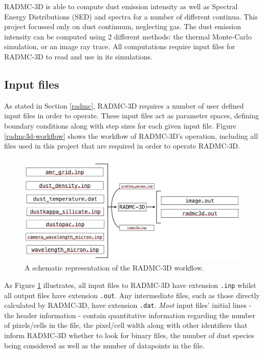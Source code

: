 \documentclass{report}
\begin{document}
RADMC-3D is able to compute dust emission intensity as well as Spectral Energy Distributions (SED) and spectra for a number of different continua. This project focussed only on dust continuum, neglecting gas. The dust emission intensity can be computed using 2 different methods: the thermal Monte-Carlo simulation, or an image ray trace. All computations require input files for RADMC-3D to read and use in its simulations.

\subsection{Input files} \label{inp}
As stated in Section \ref{radmc}, RADMC-3D requires a number of user defined input files in order to operate. These input files act as parameter spaces, defining boundary conditions along with step sizes for each given input file. Figure \ref{radmc3d-workflow} shows the workflow of RADMC-3D's operation, including all files used in this project that are required in order to operate RADMC-3D.

\begin{figure}[h]
  \centering
  \includegraphics[scale=0.4]{../img/radmc3d-workflow}
  \caption[A schematic representation of the RADMC-3D workflow.]{A schematic representation of the RADMC-3D workflow.}
  \label{fig:radmc3d-workflow}
\end{figure}

As Figure \ref{fig:radmc3d-workflow} illustrates, all input files to RADMC-3D have extension \texttt{.inp} whilst all output files have extension \texttt{.out}. Any intermediate files, such as those directly calculated by RADMC-3D, have extension \texttt{.dat}. \textit{Most} input files' initial lines - the header information - contain quantitative information regarding the number of pixels/cells in the file, the pixel/cell width along with other identifiers that inform RADMC-3D whether to look for binary files, the number of dust species being considered as well as the number of datapoints in the file.
\end{document}
